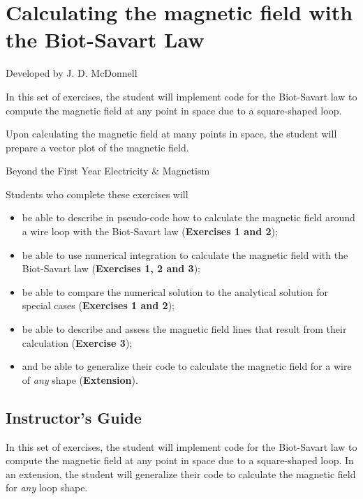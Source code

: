\documentclass[]{article}
\date{}
\providecommand{\tightlist}{%
  \setlength{\itemsep}{0pt}\setlength{\parskip}{0pt}}
\begin{document}
\section{Calculating the magnetic field with the Biot-Savart
Law}\label{calculating-the-magnetic-field-with-the-biot-savart-law}

Developed by J. D. McDonnell

In this set of exercises, the student will implement code for the
Biot-Savart law to compute the magnetic field at any point in space due
to a square-shaped loop.

Upon calculating the magnetic field at many points in space, the student
will prepare a vector plot of the magnetic field.

\begin{description}
\tightlist
\item[Course Context]
Beyond the First Year Electricity \& Magnetism
\item[Learning Objectives]
Students who complete these exercises will
\end{description}

\begin{itemize}
\tightlist
\item
  be able to describe in pseudo-code how to calculate the magnetic field
  around a wire loop with the Biot-Savart law (\textbf{Exercises 1 and
  2});
\item
  be able to use numerical integration to calculate the magnetic field
  with the Biot-Savart law (\textbf{Exercises 1, 2 and 3});
\item
  be able to compare the numerical solution to the analytical solution
  for special cases (\textbf{Exercises 1 and 2});
\item
  be able to describe and assess the magnetic field lines that result
  from their calculation (\textbf{Exercise 3});
\item
  and be able to generalize their code to calculate the magnetic field
  for a wire of \emph{any} shape (\textbf{Extension}).
\end{itemize}

\subsection{Instructor's Guide}\label{instructors-guide}

In this set of exercises, the student will implement code for the
Biot-Savart law to compute the magnetic field at any point in space due
to a square-shaped loop. In an extension, the student will generalize
their code to calculate the magnetic field for \emph{any} loop shape.
\end{document}
